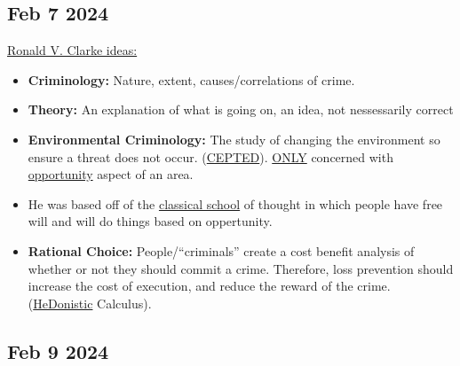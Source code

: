 \documentclass[12pt]{article}
\begin{document}
\subsection*{Feb 7 2024}

\underline{Ronald V. Clarke ideas:}

\begin{itemize}
		  \item \textbf{Criminology:} Nature, extent, causes/correlations of crime.
		  \item \textbf{Theory:} An explanation of what is going on, an idea, not nessessarily correct
		  \item \textbf{Environmental Criminology:} The study of changing the environment so ensure
					 a threat does not occur. (\underline{CEPTED}). \underline{ONLY} concerned with 
					 \underline{opportunity} aspect of an area.
		  \item He was based off of the \underline{classical school} of thought in which people have free will
					 and will do things based on oppertunity. 
		  \item \textbf{Rational Choice:} People/``criminals'' create a cost benefit analysis of whether or not they
					 should commit a crime. Therefore, loss prevention should increase the cost of execution,
					 and reduce the reward of the crime. (\underline{HeDonistic} Calculus).
\end{itemize}

\subsection*{Feb 9 2024}
\end{document}

